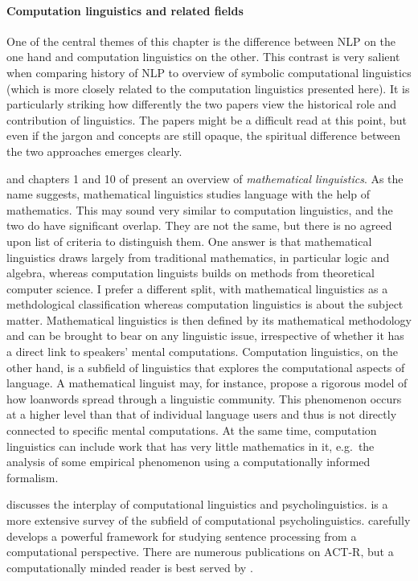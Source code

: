 \begin{literature}

\paragraph{Computation linguistics and related fields}
One of the central themes of this chapter is the difference between NLP on the one hand and computation linguistics on the other.
This contrast is very salient when comparing  history of NLP to  overview of symbolic computational linguistics (which is more closely related to the computation linguistics presented here).
It is particularly striking how differently the two papers view the historical role and contribution of linguistics.
The papers might be a difficult read at this point, but even if the jargon and concepts are still opaque, the spiritual difference between the two approaches emerges clearly.

\citet{PullumKornai03} and chapters 1 and 10 of \citet{Kornai07} present an overview of \emph{mathematical linguistics}.
As the name suggests, mathematical linguistics studies language with the help of mathematics.
This may sound very similar to computation linguistics, and the two do have significant overlap.
They are not the same, but there is no agreed upon list of criteria to distinguish them.
One answer is that mathematical linguistics draws largely from traditional mathematics, in particular logic and algebra, whereas computation linguists builds on methods from theoretical computer science.
I prefer a different split, with mathematical linguistics as a methdological classification whereas computation linguistics is about the subject matter.
Mathematical linguistics is then defined by its mathematical methodology and can be brought to bear on any linguistic issue, irrespective of whether it has a direct link to speakers' mental computations.
Computation linguistics, on the other hand, is a subfield of linguistics that explores the computational aspects of language.
A mathematical linguist may, for instance, propose a rigorous model of how loanwords spread through a linguistic community.
This phenomenon occurs at a higher level than that of individual language users and thus is not directly connected to specific mental computations.
At the same time, computation linguistics can include work that has very little mathematics in it, e.g.~the analysis of some empirical phenomenon using a computationally informed formalism.

\citet{Krahmer10} discusses the interplay of computational linguistics and psycholinguistics.
\citet{Crocker10} is a more extensive survey of the subfield of computational psycholinguistics.
\citet{Hale14} carefully develops a powerful framework for studying sentence processing from a computational perspective.
There are numerous publications on ACT-R, but a computationally minded reader is best served by \citet{Whitehill13}.



\end{literature}
